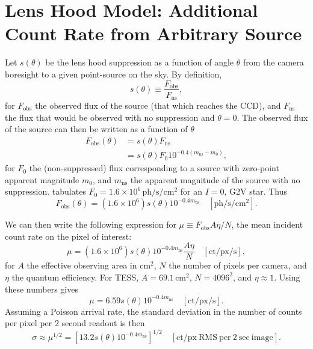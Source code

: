 \section{Lens Hood Model: Additional Count Rate from Arbitrary Source}
Let $s(\theta)$ be the lens hood suppression as a function of angle $\theta$ 
from the camera boresight to a given point-source on the sky. By definition,
\begin{equation}
s(\theta) \equiv \frac{F_\mathrm{obs}}{F_\mathrm{ns}},
\end{equation}
for $F_\mathrm{obs}$ the observed flux of the source (that which reaches the 
CCD), and $F_\mathrm{ns}$ the flux that would be observed with no 
suppression and $\theta=0$.
The observed flux of the source can then be written as a function of $\theta$
\begin{align}
	F_\mathrm{obs}(\theta) &= s(\theta) F_\mathrm{ns}  \\
	&= s(\theta) F_0 10^{-0.4(m_\mathrm{ns} - m_0)} ,
\end{align}
for $F_0$ the (non-suppressed) flux corresponding to a source with zero-point 
apparent magnitude $m_0$, and $m_\mathrm{ns}$ the apparent magnitude of 
the source with no suppression.
\citet{winn_searchable_2013} tabulates $F_0 = 
1.6\times10^6\,\mathrm{ph/s/cm^2}$ 
for an $I=0$, G2V star.
Thus
\begin{equation}
F_\mathrm{obs}(\theta) = (1.6\times 10^6) s(\theta) 10^{-0.4 m_\mathrm{ns}} 
\quad \mathrm{[ph/s/cm^2]}.
\end{equation}

We can then write the following expression for $\mu\equiv F_\mathrm{obs} A \eta 
/ N$, the mean incident count rate on the pixel of interest:
\begin{equation}
\mu =  (1.6\times 10^6) s(\theta) 10^{-0.4 m_\mathrm{ns}} \frac{A 
\eta}{N} \quad \mathrm{[ct/px/s]},
\end{equation}
for $A$ the effective observing area in $\mathrm{cm^2}$, $N$ the 
number of pixels per camera, and $\eta$ the quantum efficiency.
For TESS, $A=69.1\,\mathrm{cm^2}$, $N=4096^2$, and $\eta\approx 1$. Using
these numbers gives
\begin{equation}
\mu = 6.59  s(\theta) 10^{-0.4 m_\mathrm{ns}}\quad 
\mathrm{[ct/px/s]}.
\label{eq:mean_added_flux}
\end{equation}
Assuming a Poisson arrival rate, the standard deviation in the number of counts 
per pixel per 2 second readout is then
\begin{equation}
\sigma \approx \mu^{1/2} = \left[ 13.2 s(\theta) 10^{-0.4 m_\mathrm{ns}} 
\right]^{1/2}\quad \mathrm{[ct/px\ RMS\ per\ 2\ sec\ image]}.
\label{eq:added_RMS}
\end{equation}

